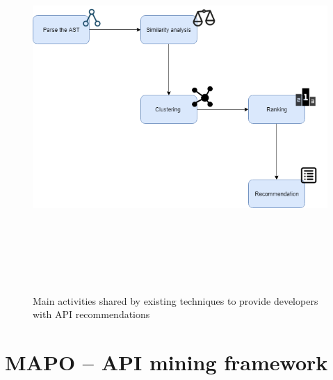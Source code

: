 \begin{figure}[!h]
	\includegraphics[width=12cm,height=14cm,keepaspectratio]{images/approach.png}
	\centering
	\caption{Main activities shared by existing techniques to provide 
	developers with API recommendations}
	\label{fig:apiRecommendationExistingApproaches}
\end{figure}










\section{MAPO -- API mining framework}

